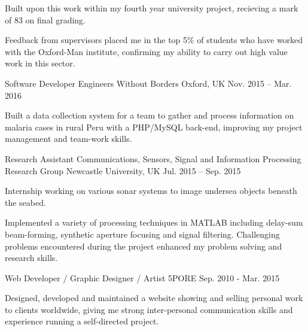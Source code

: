 \begin{cventries}
{\begin{cvitems}
        \item {Built upon this work within my fourth year university project, recieving a mark of 83 on final grading.}
        \item{Feedback from supervisors placed me in the top 5\% of students who have worked with the Oxford-Man institute, confirming my ability to carry out high value work in this sector.}
      \end{cvitems}
    }
    \cventry
    {Software Developer}
    {Engineers Without Borders}
    {Oxford, UK}
    {Nov. 2015 – Mar. 2016}
    {
      \begin{cvitems}
        \item {Built a data collection system for a team to gather and process information on malaria cases in rural Peru with a PHP/MySQL back-end, improving my project management and team-work skills.}
      \end{cvitems}
    }
  \cventry
    {Research Assistant}
    {Communications, Sensors, Signal and Information Processing Research Group}
    {Newcastle University, UK}
    {Jul. 2015 – Sep. 2015}
    {
      \begin{cvitems}
        \item {Internship working on various sonar systems to image undersea objects beneath the seabed.}
        \item {Implemented a variety of processing techniques in MATLAB including delay-sum beam-forming, synthetic
aperture focusing and signal filtering. Challenging problems encountered during the project enhanced my problem solving and research skills.}
      \end{cvitems}
    }
  \cventry
    {Web Developer / Graphic Designer / Artist}
    {5PORE}
    {}
    {Sep. 2010 - Mar. 2015}
    {
      \begin{cvitems}
        \item {Designed, developed and maintained a website showing and selling personal work to clients worldwide, giving me strong inter-personal communication skills and experience running a self-directed project.}
      \end{cvitems}
    }
\end{cventries}
